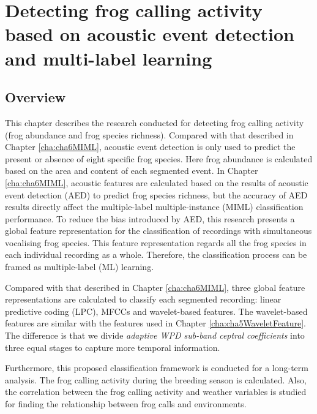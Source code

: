 
\chapter{Detecting frog calling activity based on acoustic event detection and multi-label learning}
\label{cha:cha7ML}


\section{Overview}
\label{sect:introduction}

This chapter describes the research conducted for detecting frog calling activity (frog abundance and frog species richness). Compared with that described in Chapter \ref{cha:cha6MIML}, acoustic event detection is only used to predict the present or absence of eight specific frog species. Here frog abundance is calculated based on the area and content of each segmented event.
In Chapter \ref{cha:cha6MIML}, acoustic features are calculated based on the results of acoustic event detection (AED) to predict frog species richness, but the accuracy of AED results directly affect the multiple-label multiple-instance (MIML) classification performance.
To reduce the bias introduced by AED, this research presents a global feature representation for the classification of recordings with simultaneous vocalising frog species. This feature representation regards all the frog species in each individual recording as a whole. Therefore, the classification process can be framed as multiple-label (ML) learning.  



Compared with that described in Chapter \ref{cha:cha6MIML}, three global feature representations are calculated to classify each segmented recording: linear predictive coding (LPC), MFCCs and wavelet-based features. The wavelet-based features are similar with the features used in Chapter \ref{cha:cha5WaveletFeature}. The difference is that we divide \textit{adaptive WPD sub-band ceptral coefficients} into three equal stages to capture more temporal information.


 
Furthermore, this proposed classification framework is conducted for a long-term analysis. The frog calling activity during the breeding season is calculated. Also, the correlation between the frog calling activity and weather variables is studied for finding the relationship between frog calls and environments. 

